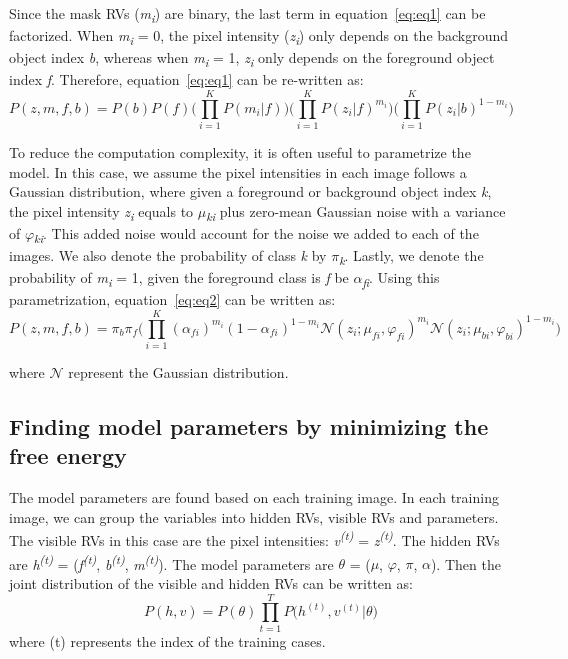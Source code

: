 \documentclass{article} %
\begin{document}
Since the mask RVs (\textit{m}\textsubscript{\textit{i}}) are binary, the last term in equation~\ref{eq:eq1} can be factorized. When \textit{m}\textsubscript{\textit{i}} = 0, the pixel intensity (\textit{z}\textsubscript{\textit{i}}) only depends on the background object index \textit{b}, whereas when \textit{m}\textsubscript{\textit{i}} = 1, \textit{z}\textsubscript{\textit{i}} only depends on the foreground object index \textit{f}. Therefore, equation~\ref{eq:eq1} can be re-written as:
\begin{equation}
P(z,m,f,b) = P(b)P(f)\Bigg( \prod_{i=1}^KP(m_{i}|f)\Bigg)\Bigg( \prod_{i=1}^KP(z_{i}|f)^{m_{i}}\Bigg)\Bigg( \prod_{i=1}^KP(z_{i}|b)^{1-m_{i}}\Bigg)
\label{eq:eq2}
\end{equation}

To reduce the computation complexity, it is often useful to parametrize the model. In this case, we assume the pixel intensities in each image follows a Gaussian distribution, where given a foreground or background object index \textit{k}, the pixel intensity \textit{z}\textsubscript{\textit{i}} equals to \textit{$\mu$}\textsubscript{\textit{ki}} plus zero-mean Gaussian noise with a variance of \textit{$\varphi$}\textsubscript{\textit{ki}}. This added noise would account for the noise we added to each of the images. We also denote the probability of class \textit{k} by \textit{$\pi$}\textsubscript{\textit{k}}. Lastly, we denote the probability of \textit{m}\textsubscript{\textit{i}} = 1, given the foreground class is \textit{f} be \textit{$\alpha$}\textsubscript{\textit{fi}}. Using this parametrization, equation~\ref{eq:eq2} can be written as:
\begin{equation}
P(z,m,f,b) = \pi_{b} \pi_{f} \Bigg( \prod_{i=1}^K {(\alpha_{fi})}^{m_{i}} {(1-\alpha_{fi})}^{1-m_{i}} \mathcal{N}(z_i;\mu_{fi},\varphi_{fi})^{m_{i}}\mathcal{N}(z_i;\mu_{bi},\varphi_{bi})^{1-m_{i}} \Bigg)
\label{eq:eq3}
\end{equation}

where $\mathcal{N}$ represent the Gaussian distribution. 

\subsection{Finding model parameters by minimizing the free energy}
\label{free_energy}
The model parameters are found based on each training image. In each training image, we can group the variables into hidden RVs, visible RVs and parameters. The visible RVs in this case are the pixel intensities: \textit{v}\textsuperscript{\textit{(t)}} = \textit{z}\textsuperscript{\textit{(t)}}. The hidden RVs are \textit{h}\textsuperscript{\textit{(t)}} = (\textit{f}\textsuperscript{\textit{(t)}}, \textit{b}\textsuperscript{\textit{(t)}}, \textit{m}\textsuperscript{\textit{(t)}}). The model parameters are \textit{$\theta$} = (\textit{$\mu$}, \textit{$\varphi$}, \textit{$\pi$}, \textit{$\alpha$}). Then the joint distribution of the visible and hidden RVs can be written as:
\begin{equation}
P(h,v) = P(\theta) \prod_{t=1}^TP\Big(h^{(t)}, v^{(t)}|\theta\Big) 
\label{eq:eq4}
\end{equation}
where (t) represents the index of the training cases.
\end{document}
